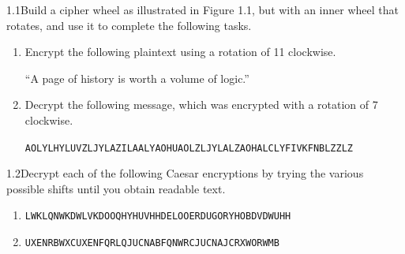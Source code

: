 \begin{exercise}
    {1.1}Build a cipher wheel as illustrated in Figure 1.1, but with an inner wheel that rotates, and use it to complete the following tasks.
    \begin{enumerate}
        \item Encrypt the following plaintext using a rotation of 11 clockwise.
              \begin{center}
                  ``A page of history is worth a volume of logic.''
              \end{center}
        \item Decrypt the following message, which was encrypted with a rotation of 7 clockwise.
              \begin{center}
                  \texttt{AOLYLHYLUVZLJYLAZILAALYAOHUAOLZLJYLALZAOHALCLYFIVKFNBLZZLZ}
              \end{center}
    \end{enumerate}
\end{exercise}


\newpage
\vfill

\begin{exercise}
    {1.2}Decrypt each of the following Caesar encryptions by trying the various possible
    shifts until you obtain readable text.
    \begin{enumerate}
        \item \texttt{LWKLQNWKDWLVKDOOQHYHUVHHDELOOERDUGORYHOBDVDWUHH}
        \item \texttt{UXENRBWXCUXENFQRLQJUCNABFQNWRCJUCNAJCRXWORWMB}
    \end{enumerate}
\end{exercise}

\vfill


